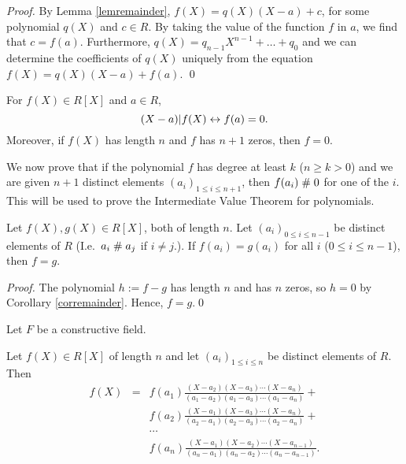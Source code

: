 \begin{proof}
By Lemma \ref{lemremainder}, $f(X) =q(X) (X-a) + c$, for some
polynomial $q(X)$ and $c\in R$. By taking the value of the function
$f$ in $a$, we find that $c= f(a)$. Furthermore, $q(X) = q_{n-1}
X^{n-1} + \ldots + q_0$ and we can determine the coefficients of
$q(X)$ uniquely from the equation $f(X) =q(X) (X-a) + f(a)$. \qed
\end{proof}

\begin{corollary}\label{corremainder}
  For $f(X)\in R[X]$ and $a\in R$, 
$$ (X-a) | f(X) \leftrightarrow f(a) = 0.$$
Moreover, if $f(X)$ has length $n$ and $f$ has $n+1$ zeros, then $f= 0$.
\end{corollary}

We now prove that if the polynomial $f$ has degree at least $k$
($n\geq k>0$) and we are given
$n+1$ distinct elements $(a_i)_{1\leq i \leq n+1}$, then $f(a_i)\mathrel{\#}
0$ for one of the $i$. This will be used to prove the Intermediate
Value Theorem for polynomials.

\begin{lemma}\label{lempolagrnpts} Let $f(X), g(X)\in R[X]$, both of
length $n$. Let $(a_i)_{0\leq i \leq n-1}$ be distinct elements of $R$ (I.e.\
$a_i \mathrel{\#} a_j$ if $i\neq j$.). If $f(a_i)=g(a_i)$ for all $i$ ($0\leq
i \leq n-1$), then $f=g$.
\end{lemma}

\begin{proof}
The polynomial $h:= f-g$ has length $n$ and has $n$ zeros,
so $h=0$ by Corollary \ref{corremainder}. Hence, $f=g$.\qed
\end{proof}

Let $F$ be a constructive field.

\begin{lemma}\label{lempolnptsform}
Let $f(X) \in R[X]$ of length $n$ and let $(a_i)_{1\leq i \leq
n}$ be distinct elements of $R$. Then
\begin{eqnarray*}
f(X) &=& f(a_1) \frac{(X-a_2)(X-a_3) \cdots (X-a_{n})}{(a_1-a_2)(a_1
-a_3) \cdots (a_1-a_{n})} +\\
&& f(a_2) \frac{(X-a_1)(X-a_3) \cdots (X-a_{n})}{(a_2-a_1)(a_2
-a_3) \cdots (a_2-a_{n})} +\\
&&\cdots\\
&& f(a_{n}) \frac{(X-a_1)(X-a_2) \cdots (X-a_{n-1})}{(a_{n}-a_1)(a_{n}
-a_2) \cdots (a_{n}-a_{n-1})}.\\
\end{eqnarray*}
\end{lemma}

